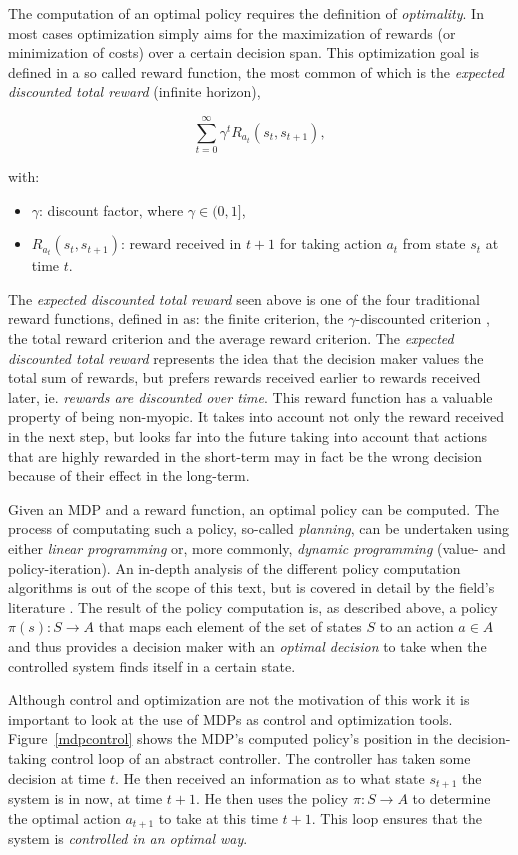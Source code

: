 The computation of an optimal policy requires the definition of \textit{optimality}. In most cases optimization simply aims for the maximization of rewards (or minimization of costs) over a certain decision span. This optimization goal is defined in a so called reward function, the most common of which is the \textit{expected discounted total reward} (infinite horizon),

\[
\sum_{t=0}^{\infty} {\gamma}^{t}R_{a_t}(s_t,s_{t+1}),
\]

with:
\begin{itemize}
\item $\gamma$: discount factor, where $\gamma\in(0,1]$,
\item $R_{a_t}(s_t,s_{t+1})$: reward received in $t+1$ for taking action $a_t$ from state $s_t$ at time $t$.	
\end{itemize}

The \textit{expected discounted total reward} seen above is one of the four traditional reward functions, defined in \cite{mdpai} as: the finite criterion, the $\gamma$-discounted criterion , the total reward criterion and the average reward criterion. The \textit{expected discounted total reward} represents the idea that the decision maker values the total sum of rewards, but prefers rewards received earlier to rewards received later, ie. \textit{rewards are discounted over time}. This reward function has a valuable property of being non-myopic. It takes into account not only the reward received in the next step, but looks far into the future taking into account that actions that are highly rewarded in the short-term may in fact be the wrong decision because of their effect in the long-term. 

Given an MDP and a reward function, an optimal policy can be computed. The process of computating such a policy, so-called \textit{planning}, can be undertaken using either \textit{linear programming} or, more commonly, \textit{dynamic programming} (value- and policy-iteration). An in-depth analysis of the different policy computation algorithms is out of the scope of this text, but is covered in detail by the field's literature \cite{puterman}\cite{mdpai}. The result of the policy computation is, as described above, a policy $\pi(s): S \rightarrow A$ that maps each element of the set of states $S$ to an action  $a \in A$ and thus provides a decision maker with an \textit{optimal decision} to take when the controlled system finds itself in a certain state.

Although control and optimization are not the motivation of this work it is important to look at the use of MDPs as control and optimization tools. Figure~\ref{mdpcontrol} shows the MDP's computed policy's position in the decision-taking control loop of an abstract controller. The controller has taken some decision at time $t$. He then received an information as to what state $s_{t+1}$ the system is in now, at time $t+1$. He then uses the policy $\pi: S \rightarrow A$ to determine the optimal action $a_{t+1}$ to take at this time $t+1$. This loop ensures that the system is \textit{controlled in an optimal way}.

